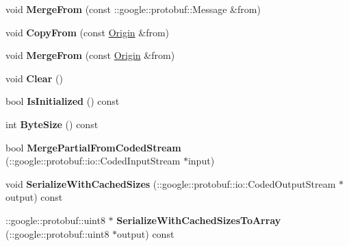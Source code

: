 \begin{DoxyCompactItemize}
\item 
\hypertarget{classlattice_1_1Origin_a5b3e6ff8bfb6a4c8e0239774783066b6}{
void {\bfseries MergeFrom} (const ::google::protobuf::Message \&from)}
\label{classlattice_1_1Origin_a5b3e6ff8bfb6a4c8e0239774783066b6}

\item 
\hypertarget{classlattice_1_1Origin_aa91d3c50ddb13b51379510603a068958}{
void {\bfseries CopyFrom} (const \hyperlink{classlattice_1_1Origin}{Origin} \&from)}
\label{classlattice_1_1Origin_aa91d3c50ddb13b51379510603a068958}

\item 
\hypertarget{classlattice_1_1Origin_a3faee262511eec654f7a0632a5e560ba}{
void {\bfseries MergeFrom} (const \hyperlink{classlattice_1_1Origin}{Origin} \&from)}
\label{classlattice_1_1Origin_a3faee262511eec654f7a0632a5e560ba}

\item 
\hypertarget{classlattice_1_1Origin_a90a1a2c78ec1f709cbb0b168fd9aa817}{
void {\bfseries Clear} ()}
\label{classlattice_1_1Origin_a90a1a2c78ec1f709cbb0b168fd9aa817}

\item 
\hypertarget{classlattice_1_1Origin_a62f1d2f32a1eaa899ad85610f1db8fe4}{
bool {\bfseries IsInitialized} () const }
\label{classlattice_1_1Origin_a62f1d2f32a1eaa899ad85610f1db8fe4}

\item 
\hypertarget{classlattice_1_1Origin_af83bae786f9add99760ee4935a135443}{
int {\bfseries ByteSize} () const }
\label{classlattice_1_1Origin_af83bae786f9add99760ee4935a135443}

\item 
\hypertarget{classlattice_1_1Origin_aa13a6b6f63ac1ea4c310f04348a8575f}{
bool {\bfseries MergePartialFromCodedStream} (::google::protobuf::io::CodedInputStream $\ast$input)}
\label{classlattice_1_1Origin_aa13a6b6f63ac1ea4c310f04348a8575f}

\item 
\hypertarget{classlattice_1_1Origin_ae2b055eae68d73af19bcda59c6b15ac6}{
void {\bfseries SerializeWithCachedSizes} (::google::protobuf::io::CodedOutputStream $\ast$output) const }
\label{classlattice_1_1Origin_ae2b055eae68d73af19bcda59c6b15ac6}

\item 
\hypertarget{classlattice_1_1Origin_aeb4b9615f229a32c2476e4528fb1fa6f}{
::google::protobuf::uint8 $\ast$ {\bfseries SerializeWithCachedSizesToArray} (::google::protobuf::uint8 $\ast$output) const }
\label{classlattice_1_1Origin_aeb4b9615f229a32c2476e4528fb1fa6f}


\end{DoxyCompactItemize}
